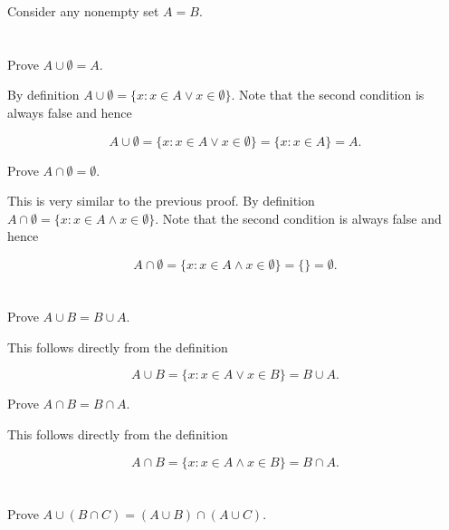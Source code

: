 \documentclass[a4paper]{article}
\begin{document}
Consider any nonempty set $A = B$.


\section{}

Prove $A \cup \emptyset = A$.

\vspace{\baselineskip}

By definition $A \cup \emptyset = \{ x : x \in A \lor x \in \emptyset \}$. Note that the second condition is always false and hence

$$A \cup \emptyset = \{ x : x \in A \lor x \in \emptyset \} = \{ x : x \in A \} = A.$$

Prove $A \cap \emptyset = \emptyset$.

\vspace{\baselineskip}

This is very similar to the previous proof. By definition $A \cap \emptyset = \{ x : x \in A \land x \in \emptyset \}$. Note that the second condition is always false and hence

$$A \cap \emptyset = \{ x : x \in A \land x \in \emptyset \} = \{ \} = \emptyset.$$


\section{}

Prove $A \cup B = B \cup A$.

\vspace{\baselineskip}

This follows directly from the definition

$$A \cup B = \{x : x \in A \lor x \in B\} = B \cup A.$$

Prove $A \cap B = B \cap A$.

\vspace{\baselineskip}

This follows directly from the definition

$$A \cap B = \{x : x \in A \land x \in B\} = B \cap A.$$


\section{}

Prove $A \cup (B \cap C) = (A \cup B) \cap (A \cup C)$.

\vspace{\baselineskip}
\end{document}
